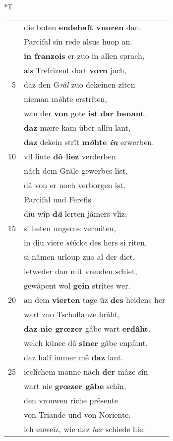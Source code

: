 \documentclass[8pt,a4paper,notitlepage]{article}
\begin{document}
\begin{table}[ht]
\begin{minipage}[t]{0.5\linewidth}
\begin{center}*T
\end{center}
\begin{tabular}{rl}
 & die boten \textbf{endehaft vuoren} dan.\\ 
 & Parcifal sîn rede alsus huop an.\\ 
 & \textbf{in franzois} er zuo in allen sprach,\\ 
 & als Trefrizent dort \textbf{vo\textit{r}n} jach,\\ 
5 & daz den G\textit{râl} zuo dekeinen zîten\\ 
 & nieman m\textit{ö}hte erstrîten,\\ 
 & wan der \textbf{von} gote \textbf{ist} \textbf{dar benant}.\\ 
 & \textbf{daz} mære kam über alliu lant,\\ 
 & \textbf{daz} dekein strît \textbf{m\textit{ö}hte \textit{in}} erwerben.\\ 
10 & vil liute \textbf{dô liez} verderben\\ 
 & nâch dem Grâle gewerbes list,\\ 
 & dâ von er noch verborgen ist.\\ 
 & Parcifal und Ferefis\\ 
 & diu wîp \textbf{d\textit{â}} lerten jâmers vlîz.\\ 
15 & si heten ungerne vermiten,\\ 
 & in diu viere \textit{stü}ck\textit{e} des hers si riten.\\ 
 & si nâmen urloup zuo al der diet.\\ 
 & ietweder dan mit vreuden schiet,\\ 
 & gewâpent wol \textbf{gein} strîtes wer.\\ 
20 & an dem \textbf{vierten} tage ûz \textbf{des} heidens her\\ 
 & wart zuo Tschoflanze brâht,\\ 
 & \textbf{daz nie grœzer} gâbe wart \textbf{erdâht}.\\ 
 & welch künec dâ \textbf{sîner} gâbe enpfant,\\ 
 & daz half immer mê \textbf{daz} lant.\\ 
25 & ieclîchem manne nâch \textbf{der} mâze sîn\\ 
 & wart nie \textbf{grœzer gâbe} schîn,\\ 
 & den vrouwen rîche prêsente\\ 
 & von Triande und von Noriente.\\ 
 & ich enweiz, wie daz \textit{h}er schiede hie.\\ 

\end{tabular}
\end{minipage}
\end{table}
\end{document}
